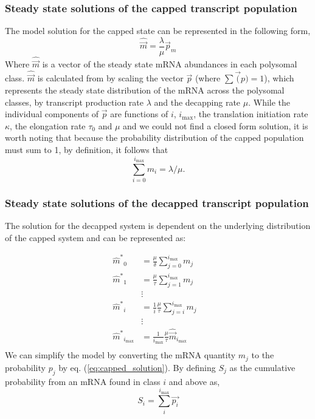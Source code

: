 \documentclass[review]{elsarticle}
\newcommand{\imax}{\ensuremath{{i_{\max}}}\xspace}
\newcommand{\mhat}{\ensuremath{\hat{m}}\xspace}
\newcommand{\mhatstar}{\ensuremath{\mhat^{*}}\xspace}
\newcommand{\mvec}{\ensuremath{\vec{m}}\xspace}
\newcommand{\mvechat}{\ensuremath{\hat{\mvec}}\xspace}
\begin{document}
\subsubsection{Steady state solutions of the capped transcript population}
 The model solution for the capped state can be represented in the following form,
	\begin{equation} \label{eq:capped_solution}
		\mvechat=\frac{\lambda}{\mu}\vec{p}_m
	\end{equation}
Where \mvechat is a vector of the steady state mRNA abundances in each polysomal class.
\mvechat is calculated from by scaling  the vector $\vec{p}$ (where $\sum \vec(p) = 1$), which represents the steady state distribution of the mRNA across the polysomal classes, by transcript production rate $\lambda$ and the decapping rate $\mu$.
While the individual components of $\vec{p}$ are functions of $i$, \imax, the translation initiation rate $\kappa$, the elongation rate $\tau_0$ and $\mu$ and we could not find a closed form solution, it is worth noting that because the probability distribution of the capped population must sum to 1, by definition, it follows that
\begin{equation}\label{eq:capped_sum}
\sum_{i = 0} ^\imax m_i = \lambda/\mu.
\end{equation}

\subsubsection{Steady state solutions of the decapped transcript population}

The solution for the decapped system is dependent on the underlying distribution of the capped system and can be represented as:

\begin{align}\label{eq:decapped_abundance}
\mhatstar_0  &= \frac{\mu}{\delta}\sum_{j=0}^{\imax}m_{j} \\ \nonumber
\mhatstar_1  &= \frac{\mu}{\tau}\sum_{j=1}^{\imax}m_{j}  \\ \nonumber
& \vdots & \\ \nonumber
\mhatstar_i  &= \frac{1}{i}\frac{\mu}{\tau}\sum_{j=i}^{\imax}m_{j}  \\ \nonumber
& \vdots & \\ \nonumber
\mhatstar_{\imax}  &= \frac{1}{\imax}\frac{\mu}{\tau} \mvechat_{\imax}   \\ \nonumber
\end{align}
We can simplify the model by converting the mRNA quantity $m_{j}$ to the probability $p_{j}$ by eq. (\ref{eq:capped_solution}).
By defining $S_{j}$ as the cumulative probability from an mRNA found in class $i$ and above as,
\begin{equation}
		S_{i} = \sum_{i}^{\imax}\vec{p_{i}}
\end{equation}
\end{document}
